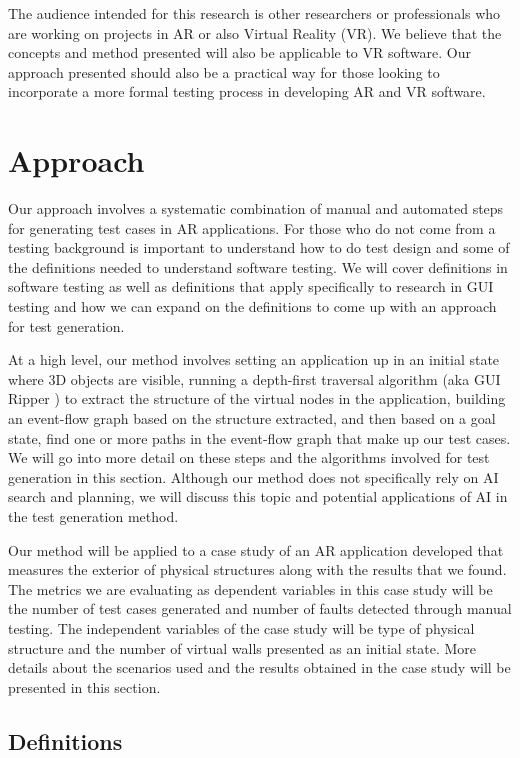 \documentclass[final,3p]{CSP}
\begin{document}
The audience intended for this research is other researchers or professionals who are working on projects in AR or also Virtual Reality (VR).  We believe that the concepts and method presented will also be applicable to VR software.  Our approach presented should also be a practical way for those looking to incorporate a more formal testing process in developing AR and VR software.

\section{Approach}
\noindent
Our approach involves a systematic combination of manual and automated steps for generating test cases in AR applications.  For those who do not come from a testing background is important to understand how to do test design and some of the definitions needed to understand software testing.  We will cover definitions in software testing as well as definitions that apply specifically to research in GUI testing and how we can expand on the definitions to come up with an approach for test generation.

At a high level, our method involves setting an application up in an initial state where 3D objects are visible, running a depth-first traversal algorithm (aka GUI Ripper \cite{GUIRip}) to extract the structure of the virtual nodes in the application, building an event-flow graph \cite{EventFlow} based on the structure extracted, and then based on a goal state, find one or more paths in the event-flow graph that make up our test cases.  We will go into more detail on these steps and the algorithms involved for test generation in this section.  Although our method does not specifically rely on AI search and planning, we will discuss this topic and potential applications of AI in the test generation method.

Our method will be applied to a case study of an AR application developed that measures the exterior of physical structures along with the results that we found.  The metrics we are evaluating as dependent variables in this case study will be the number of test cases generated and number of faults detected through manual testing.  The independent variables of the case study will be type of physical structure and the number of virtual walls presented as an initial state.  More details about the scenarios used and the results obtained in the case study will be presented in this section.

\subsection{Definitions}
\noindent
\end{document}
